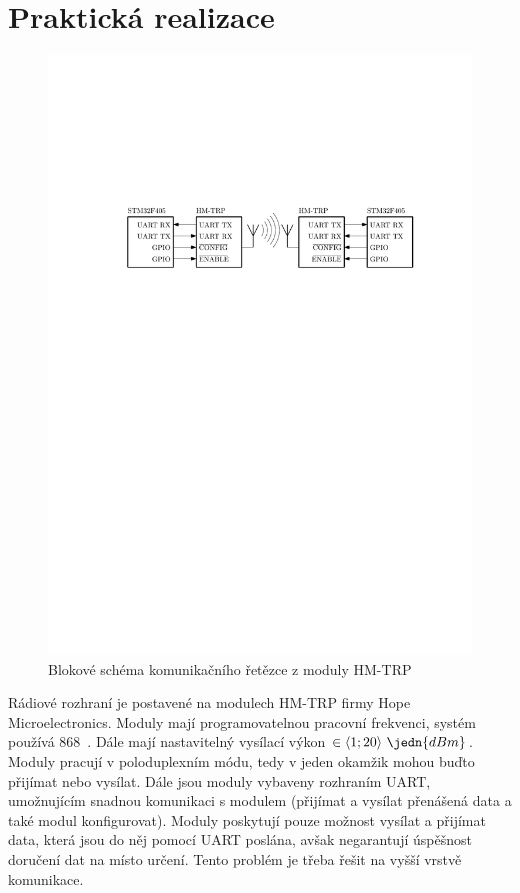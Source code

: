 \section{Praktická realizace}
\begin{figure}[H]
    \begin{center}
        \includegraphics[width=\textwidth]{img/hm-trp}
    \end{center}
    \caption{Blokové schéma komunikačního řetězce z moduly HM-TRP}
\end{figure}
Rádiové rozhraní je postavené na modulech HM-TRP firmy Hope Microelectronics. Moduly mají programovatelnou pracovní frekvenci, systém používá 868~. Dále mají nastavitelný vysílací výkon $\in \langle 1; 20 \rangle~\jedn{dBm}$. Moduly pracují v poloduplexním módu, tedy v jeden okamžik mohou buďto přijímat nebo vysílat. Dále jsou moduly vybaveny rozhraním UART, umožnujícím snadnou komunikaci s modulem (přijímat a vysílat přenášená data a také modul konfigurovat). Moduly poskytují pouze možnost vysílat a přijímat data, která jsou do něj pomocí UART poslána, avšak negarantují úspěšnost doručení dat na místo určení. Tento problém je třeba řešit na vyšší vrstvě komunikace.

